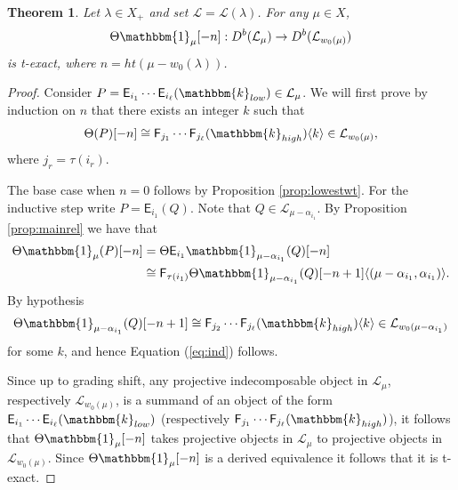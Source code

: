 \documentclass[11pt,reqno]{amsart}
\numberwithin{equation}{section}
\newtheorem{Theorem}[equation]{Theorem}
\theoremstyle{definition}
\theoremstyle{named}
\newcommand{\sE}{\mathsf{E}}
\newcommand{\sF}{\mathsf{F}}
\newcommand{\cL}{\mathcal{L}}
\newcommand{\kk}{\mathbbm{k}}
\newcommand{\ZZ}{\mathbb{Z}}
\newcommand{\bone}{\mathbbm{1}}
\newcommand{\mmod}{\mathrm{-mod}}
\newcommand{\Hom}{\operatorname{Hom}}
\begin{document}
\begin{Theorem}\label{thm:mincat}
Let $\lambda \in X_+$ and set $\cL=\cL(\lambda)$.  For any $\mu \in X$, $$\Theta\bone_\mu[-n]:D^b(\cL_\mu) \to D^b(\cL_{w_0(\mu)})$$ is t-exact, where $n=ht(\mu-w_0(\lambda))$.
\end{Theorem}

\begin{proof}
Consider  $P=\sE_{i_1}\cdots \sE_{i_\ell}(\kk_{low}) \in \cL_\mu$.  We will first prove by induction on $n$ that there exists an integer $k$ such that 
\begin{align}\label{eq:ind}
\Theta(P)[-n] \cong \sF_{j_1}\cdots \sF_{j_\ell}(\kk_{high})\langle k \rangle \in \cL_{w_0(\mu)},
\end{align}
where $j_r=\tau(i_{r})$.

The base case when $n=0$ follows by Proposition \ref{prop:lowestwt}.  For the inductive step write $P=\sE_{i_1}(Q)$. Note that $Q\in \cL_{\mu-\alpha_{i_1}}$.  By Proposition \ref{prop:mainrel} we have that 
\begin{align*}
\Theta\bone_\mu(P)[-n] &= \Theta \sE_{i_1}\bone_{\mu-\alpha_{i_1}}(Q)[-n] \\
&\cong \sF_{\tau(i_1)}\Theta\bone_{\mu-\alpha_{i_1}}(Q)[-n+1]\langle (\mu-\alpha_{i_1},\alpha_{i_1}) \rangle.
\end{align*}
By hypothesis $$\Theta\bone_{\mu-\alpha_{i_1}}(Q)[-n+1] \cong \sF_{j_2}\cdots \sF_{j_\ell}(\kk_{high})\langle k \rangle \in \cL_{w_0(\mu-\alpha_{i_1})}$$ for some $k$, and hence Equation (\ref{eq:ind}) follows.

Since up to grading shift, any projective indecomposable object in $\cL_\mu$, respectively $\cL_{w_0(\mu)}$, is a summand of an object of the form $\sE_{i_1}\cdots \sE_{i_\ell}(\kk_{low})$ (respectively $\sF_{j_1}\cdots \sF_{j_\ell}(\kk_{high})$), it follows that $\Theta\bone_\mu[-n]$ takes projective objects in $\cL_\mu$ to projective objects in $\cL_{w_0(\mu)}$.  Since $\Theta\bone_\mu[-n]$ is a derived equivalence it follows that it is t-exact.

\end{proof}
\end{document}
